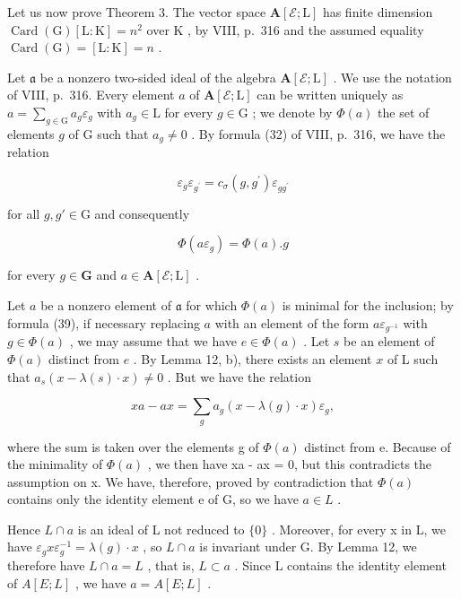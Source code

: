 Let us now prove Theorem 3. The vector space \(\mathbf{A}[\mathcal{E};\mathrm{L}]\) has finite dimension \(\operatorname{Card}(\mathrm{G})[\mathrm{L}:\mathrm{K}] = n^2\) over \(\mathrm{K}\) , by VIII, p.~316 and the assumed equality \(\operatorname{Card}(\mathrm{G}) = [\mathrm{L}:\mathrm{K}] = n\) .

Let \(\mathfrak{a}\) be a nonzero two-sided ideal of the algebra \(\mathbf{A}[\mathcal{E};\mathrm{L}]\) . We use the notation of VIII, p.~316. Every element \(a\) of \(\mathbf{A}[\mathcal{E};\mathrm{L}]\) can be written uniquely as \(a = \sum_{g\in \mathrm{G}}a_g\varepsilon_g\) with \(a_g\in \mathrm{L}\) for every \(g\in \mathrm{G}\) ; we denote by \(\Phi (a)\) the set of elements \(g\) of \(\mathrm{G}\) such that \(a_g\neq 0\) . By formula (32) of VIII, p.~316, we have the relation

\[
\varepsilon_ {g} \varepsilon_ {g ^ {\prime}} = c _ {\sigma} (g, g ^ {\prime}) \varepsilon_ {g g ^ {\prime}}\tag{38}
\]

for all \(g, g' \in \mathrm{G}\) and consequently

\[
\Phi (a \varepsilon_ {g}) = \Phi (a). g\tag{39}
\]

for every \(g\in \mathbf{G}\) and \(a\in \mathbf{A}[\mathcal{E};\mathrm{L}]\) .

Let \(a\) be a nonzero element of \(\mathfrak{a}\) for which \(\Phi(a)\) is minimal for the inclusion; by formula (39), if necessary replacing \(a\) with an element of the form \(a\varepsilon_{g^{-1}}\) with \(g\in\Phi(a)\) , we may assume that we have \(e\in\Phi(a)\) . Let \(s\) be an element of \(\Phi(a)\) distinct from \(e\) . By Lemma 12, b), there exists an element \(x\) of L such that \(a_s(x-\lambda(s)\cdot x)\neq0\) . But we have the relation

\[
x a - a x = \sum_ {g} a _ {g} (x - \lambda (g) \cdot x) \varepsilon_ {g},\tag{40}
\]

where the sum is taken over the elements g of \(\Phi(a)\) distinct from e. Because of the minimality of \(\Phi(a)\) , we then have xa - ax = 0, but this contradicts the assumption on x. We have, therefore, proved by contradiction that \(\Phi(a)\) contains only the identity element e of G, so we have \(a \in L\) .

Hence \(L \cap a\) is an ideal of L not reduced to \(\{0\}\) . Moreover, for every x in L, we have \(\varepsilon_{g}x\varepsilon_{g}^{-1} = \lambda(g) \cdot x\) , so \(L \cap a\) is invariant under G. By Lemma 12, we therefore have \(L \cap a = L\) , that is, \(L \subset a\) . Since L contains the identity element of \(A[E;L]\) , we have \(a = A[E;L]\) .

